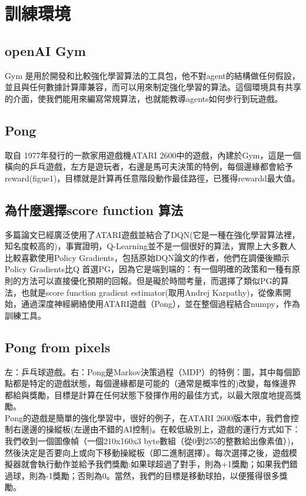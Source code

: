 \documentclass[14pt,a4paper]{report}  %
\begin{document}
\newpage
\chapter{訓練環境}
\section{openAI Gym}
\qquad Gym 是用於開發和比較強化學習算法的工具包，他不對agent的結構做任何假設，並且與任何數據計算庫兼容，而可以用來制定強化學習的算法。這個環境具有共享的介面，使我們能用來編寫常規算法，也就能教導agents如何步行到玩遊戲。\\[6pt]


\section{Pong}
\qquad 取自 1977年發行的一款家用遊戲機ATARI 2600中的遊戲，內建於Gym，這是一個橫向的乒乓遊戲，左方是遊玩者，右邊是馬可夫決策的特例，每個邊緣都會給予reward(figue1)，目標就是計算再任意階段動作最佳路徑，已獲得rewardd最大值。
\section{為什麼選擇score function 算法}
\qquad 多篇論文已經廣泛使用了ATARI遊戲並結合了DQN(它是一種在強化學習算法裡，知名度較高的)，事實證明，Q-Learning並不是一個很好的算法，實際上大多數人比較喜歡使用Policy Gradients，包括原始DQN論文的作者，他們在調優後顯示Policy Gradients比Q 首選PG，因為它是端到端的：有一個明確的政策和一種有原則的方法可以直接優化預期的回報。但是礙於時間考量，而選擇了類似PG的算法，也就是score function gradient estimator(取用Andrej Karpathy)，從像素開始，通過深度神經網絡使用ATARI遊戲（Pong），並在整個過程結合numpy，作為訓練工具。


\section{Pong from pixels}
\qquad 左：乒乓球遊戲。右：Pong是Markov決策過程（MDP）的特例：圖，其中每個節點都是特定的遊戲狀態，每個邊緣都是可能的（通常是概率性的)改變，每條邊界都給與獎勵，目標是計算在任何狀態下發揮作用的最佳方式，以最大限度地提高獎勵。\\ 
Pong的遊戲是簡單的強化學習中，很好的例子，在ATARI 2600版本中，我們會控制右邊邊的操縱板(左邊由不錯的AI控制)。在較低級別上，遊戲的運行方式如下：我們收到一個圖像幀（一個210x160x3 byte數組（從0到255的整數給出像素值）)，然後決定是否要向上或向下移動操縱板（即二進制選擇）。每次選擇之後，遊戲模擬器就會執行動作並給予我們獎勵:如果球超過了對手，則為+1獎勵；如果我們錯過球，則為-1獎勵；否則為0。當然，我們的目標是移動球拍，以便獲得很多獎勵。\\
\end{document}
